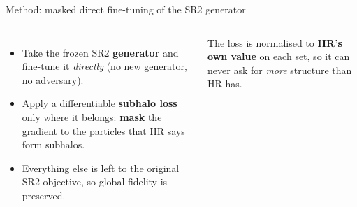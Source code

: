 \documentclass[aspectratio=169]{beamer}
\begin{document}
\begin{frame}{Method: masked direct fine-tuning of the SR2 generator}
\small
\begin{columns}[T]
\begin{itemize}
    \item Take the frozen SR2 \textbf{generator} and fine-tune it \emph{directly}
          (no new generator, no adversary).
    \item Apply a differentiable \textbf{subhalo loss} only where it belongs:
          \textbf{mask} the gradient to the particles that HR says form
          subhalos.
    \item Everything else is left to the original SR2 objective, so global
          fidelity is preserved.
\end{itemize}
\vspace{0.15cm}
{\footnotesize The loss is normalised to \textbf{HR's own value} on each set, so
it can never ask for \emph{more} structure than HR has.}
\centering
{}
\end{columns}
\end{frame}
\end{document}
